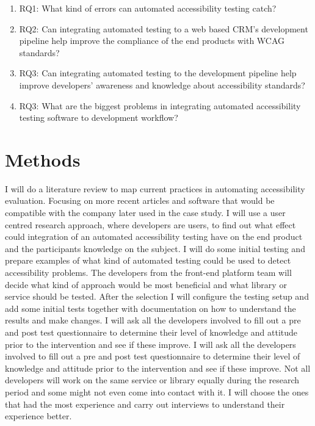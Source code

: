 \documentclass{thesis_proposal}
\begin{document}
\begin{enumerate}
    \item  RQ1: What kind of errors can automated accessibility testing catch?
    \item RQ2: Can integrating automated testing to a web based CRM’s development pipeline help improve the compliance of the end products with WCAG standards?
    \item RQ3: Can integrating automated testing to the development pipeline help improve developers’ awareness and knowledge about accessibility standards?
    \item RQ3: What are the biggest problems in integrating automated accessibility testing software to development workflow?
\end{enumerate}

\section{Methods}
I will do a literature review to map current practices in automating accessibility evaluation. Focusing on more recent articles and software that would be compatible with the company later used in the case study.
I will use a user centred research approach, where developers are users, to find out what effect could integration of an automated accessibility testing have on the end product and the participants knowledge on the subject. I will do some initial testing and prepare examples of what kind of automated testing could be used to detect accessibility problems. The developers from the front-end platform team will decide what kind of approach would be most beneficial and what library or service should be tested.
After the selection I will configure the testing setup and add some initial tests together with documentation on how to understand the results and make changes. I will ask all the developers involved to fill out a pre and post test questionnaire to determine their level of knowledge and attitude prior to the intervention and see if these improve.
I will ask all the developers involved to fill out a pre and post test questionnaire to determine their level of knowledge and attitude prior to the intervention and see if these improve. Not all developers will work on the same service or library equally during the research period and some might not even come into contact with it. I will choose the ones that had the most experience and carry out interviews to understand their experience better.
\end{document}
